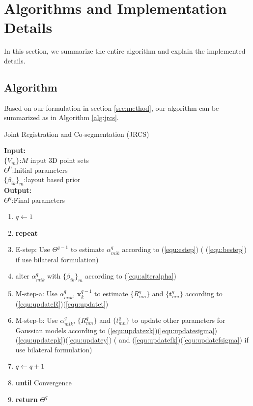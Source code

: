 \section{Algorithms and Implementation Details}
\label{sec:imp}
In this section, we summarize the entire algorithm and explain the implemented details.\\ 
\subsection{Algorithm}
Based on our formulation in section \ref{sec:method}, our algorithm can be summarized as in Algorithm \ref{alg:jrcs}.
\begin{algorithm}[htb]
	\caption{Joint Registration and Co-segmentation (JRCS)}
	\label{alg:jrcs}
	\textbf{Input:}~~\\
	$\{V_m\}$:$M$ input 3D point sets\\
	$\Theta^0$:Initial parameters~~\\
	$\{\beta_{ik}\}_{m}$:layout based prior\\
	\textbf{Output:}~~\\
	$\Theta^q$:Final parameters~~
	\begin{enumerate}
		\item $q\leftarrow1$
		\item \textbf{repeat}
		\item E-step: Use $\Theta^{q-1}$ to estimate $\alpha_{mik}^q$ according to (\ref{equ:estep}) ( (\ref{equ:bestep}) if use bilateral formulation)
		\item alter $\alpha_{mik}^q$ with $\{\beta_{ik}\}_{m}$ according to (\ref{equ:alteralpha})
		\item M-step-a: Use $\alpha^q_{mik}$, $\pmb x^{q-1}_k$ to estimate $\{R_{mn}^q\}$ and $\{\pmb t_{mn}^q\}$ according to (\ref{equ:updateR})(\ref{equ:updatet})
		\item M-step-b: Use $\alpha^q_{mik}$, $\{R_{mn}^q\}$ and $\{t_{mn}^q\}$ to update other parameters for Gaussian models according to (\ref{equ:updatexk})(\ref{equ:updatesigma})(\ref{equ:updatepk})(\ref{equ:updatey})  ( and (\ref{equ:updatefk})(\ref{equ:updatefsigma}) if use bilateral formulation)
		\item $q \leftarrow q+1$
		\item \textbf{until} Convergence
		\item \textbf{return} $\Theta^q$
	\end{enumerate}
\end{algorithm}
